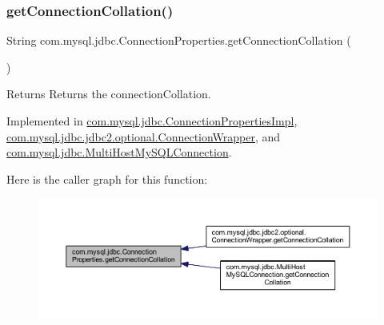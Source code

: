 \subsubsection{\texorpdfstring{get\+Connection\+Collation()}{getConnectionCollation()}}
{\footnotesize\ttfamily String com.\+mysql.\+jdbc.\+Connection\+Properties.\+get\+Connection\+Collation (\begin{DoxyParamCaption}{ }\end{DoxyParamCaption})}

\begin{DoxyReturn}{Returns}
Returns the connection\+Collation. 
\end{DoxyReturn}


Implemented in \mbox{\hyperlink{classcom_1_1mysql_1_1jdbc_1_1_connection_properties_impl_a141bde8aef1acf397baaa8d9e5e65f51}{com.\+mysql.\+jdbc.\+Connection\+Properties\+Impl}}, \mbox{\hyperlink{classcom_1_1mysql_1_1jdbc_1_1jdbc2_1_1optional_1_1_connection_wrapper_a84565674abf2610e671950412a2c8be7}{com.\+mysql.\+jdbc.\+jdbc2.\+optional.\+Connection\+Wrapper}}, and \mbox{\hyperlink{classcom_1_1mysql_1_1jdbc_1_1_multi_host_my_s_q_l_connection_a3cde7bb1197d4ba1f7ed76e515d30d8d}{com.\+mysql.\+jdbc.\+Multi\+Host\+My\+S\+Q\+L\+Connection}}.

Here is the caller graph for this function\+:\nopagebreak
\begin{figure}[H]
\begin{center}
\leavevmode
\includegraphics[width=350pt]{interfacecom_1_1mysql_1_1jdbc_1_1_connection_properties_ad1204db6592b3e0cfa702d4f6abed586_icgraph}
\end{center}
\end{figure}
\mbox{\label{interfacecom_1_1mysql_1_1jdbc_1_1_connection_properties_aec0f6158d9bacdc45d430fbddcc93120}} 
